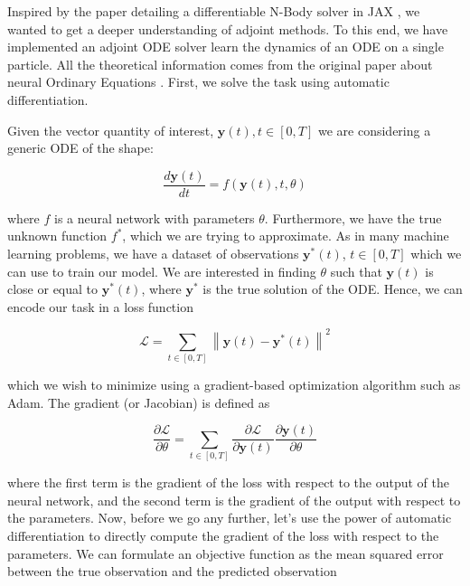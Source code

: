 \documentclass{article}
\begin{document}
{\begin{appendices}
Inspired by the paper detailing a differentiable N-Body solver in {JAX} \citep{li2024differentiable}, we wanted to get a deeper understanding of adjoint methods. To this end, we have implemented an adjoint ODE solver learn the dynamics of an ODE on a single particle. All the theoretical information comes from the original paper about neural Ordinary Equations \cite{chen2018neural}. First, we solve the task using automatic differentiation.

Given the vector quantity of interest, $\mathbf{y}(t), t \in [0, T]$ we are considering a generic ODE of the shape:

\begin{equation}
\frac{d\mathbf{y}(t)}{dt} = f(\mathbf{y}(t), t, \theta)
\end{equation}

where $f$ is a neural network with parameters $\theta$. Furthermore, we have the true unknown function $f^*$, which we are trying to approximate. As in many machine learning problems, we have a dataset of observations $\mathbf{y}^*(t)$, $t \in [0, T]$ which we can use to train our model. We are interested in finding $\theta$ such that $\mathbf{y}(t)$ is close or equal to $\mathbf{y}^*(t)$, where $\mathbf{y}^*$ is the true solution of the ODE. Hence, we can encode our task in a loss function

\begin{equation}
    \mathcal{L} = \sum_{t \in [0, T]} \left\| \mathbf{y}(t) - \mathbf{y}^*(t) \right\|^2
\end{equation}

which we wish to minimize using a gradient-based optimization algorithm such as Adam. The gradient (or Jacobian) is defined as

\begin{equation}
\frac{\partial \mathcal{L}}{\partial \theta} = \sum_{t \in [0, T]} \frac{\partial \mathcal{L}}{\partial \mathbf{y}(t)} \frac{\partial \mathbf{y}(t)}{\partial \theta}
\end{equation}

where the first term is the gradient of the loss with respect to the output of the neural network, and the second term is the gradient of the output with respect to the parameters. Now, before we go any further, let's use the power of automatic differentiation to directly compute the gradient of the loss with respect to the parameters. We can formulate an objective function as the mean squared error between the true observation and the predicted observation


\end{appendices}}
\end{document}
